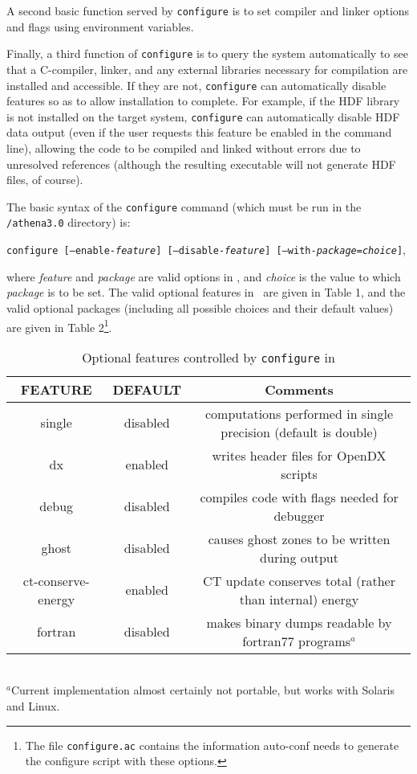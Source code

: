 A second basic function served by {\tt configure} is to set compiler and linker 
options and flags using environment variables.

Finally, a third function of {\tt configure} is to query the system
automatically to see that a C-compiler, linker, and any external
libraries necessary for compilation are installed and accessible.
If they are not, {\tt configure} can automatically disable features so as
to allow installation to complete.  For example, if the HDF library is
not installed on the target system, {\tt configure} can automatically disable
HDF data output (even if the user requests this feature be enabled in
the command line), allowing the code to be compiled and linked without
errors due to unresolved references (although the resulting executable
will not generate HDF files, of course).

The basic syntax of the {\tt configure} command (which must be run
in the {\tt /athena3.0} directory) is:
\begin{center}
{\tt configure [--enable-{\it feature}] [--disable-{\it feature}]
[--with-{\it package}={\it choice}]},
\end{center}
where {\it feature} and {\it package}
are valid options in \ath, and {\it choice} is the value to which
{\it package} is to be set.  The valid optional features in \ath\ are given in
Table 1, and the valid optional packages (including all possible choices and
their default values) are given in Table 2\footnote{The file {\tt configure.ac}
contains the information auto-conf needs to generate the configure script
with these options.}.

\begin{table}[ht]
\caption{Optional features controlled by {\tt configure} in \ath}
\begin{tabular}{|c|c|c|} \hline \hline
FEATURE & DEFAULT & Comments \\ \hline
single &  disabled & computations performed in single precision (default is double) \\
dx  & enabled & writes header files for OpenDX scripts \\
debug  & disabled & compiles code with flags needed for debugger \\
ghost  & disabled & causes ghost zones to be written during output \\
ct-conserve-energy  & enabled & CT update conserves total (rather than internal) energy \\
fortran & disabled & makes binary dumps readable by fortran77 programs$^{a}$
\\ \hline
\end{tabular}
\\$^{a}$Current implementation almost certainly not portable, but works
with Solaris and Linux.
\end{table}

